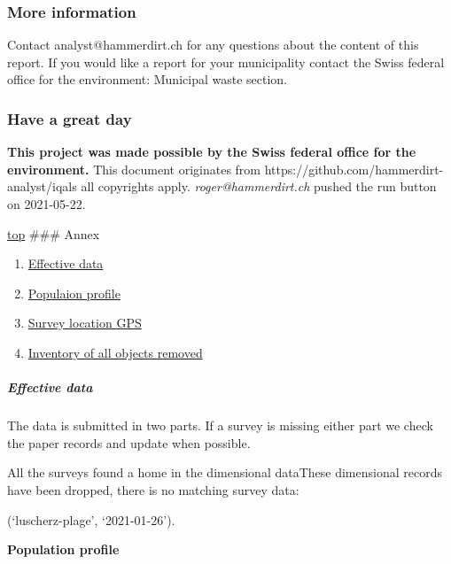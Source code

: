 \documentclass[11pt]{article}
\providecommand{\tightlist}{%
      \setlength{\itemsep}{0pt}\setlength{\parskip}{0pt}}
\begin{document}
    \hypertarget{more-information}{%
\subsubsection{More information}\label{more-information}}

Contact analyst@hammerdirt.ch for any questions about the content of
this report. If you would like a report for your municipality contact
the Swiss federal office for the environment: Municipal waste section.
 
            
    
    \hypertarget{have-a-great-day}{%
\subsubsection{\texorpdfstring{{Have a great
day}}{Have a great day}}\label{have-a-great-day}}

\textbf{This project was made possible by the Swiss federal office for
the environment.} This document originates from
https://github.com/hammerdirt-analyst/iqals all copyrights apply.
\emph{roger@hammerdirt.ch} pushed the run button on 2021-05-22.

    

    \hyperref[top]{top} \#\#\# Annex

\begin{enumerate}
\def\labelenumi{\arabic{enumi}.}
\tightlist
\item
  \hyperref[data]{Effective data}
\item
  \hyperref[popinf]{Populaion profile}
\item
  \hyperref[gps]{Survey location GPS}
\item
  \hyperref[inventory]{Inventory of all objects removed}
\end{enumerate}

\hypertarget{effective-data}{%
\subparagraph{Effective data}\label{effective-data}}

The data is submitted in two parts. If a survey is missing either part
we check the paper records and update when possible.
 
            
    
    All the surveys found a home in the dimensional dataThese dimensional
records have been dropped, there is no matching survey data:

(`luscherz-plage', `2021-01-26').

    

    \textbf{Population profile}
\end{document}
